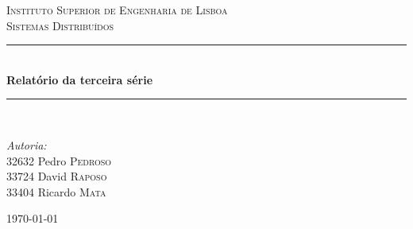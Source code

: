 \documentclass[a4paper]{article}
\newcommand{\HRule}{\rule{\linewidth}{0.5mm}} %
\begin{document}
\begin{titlepage}

\center %
 

\textsc{\LARGE Instituto Superior de Engenharia de Lisboa}\\[1.5cm] %
\textsc{\Large Sistemas Distribuídos}\\[0.5cm] %


\HRule \\[0.4cm]
{ \huge \bfseries Relatório da terceira série}\\[0.4cm] %
\HRule \\[1.5cm]
 

\begin{minipage}{0.4\textwidth}
\begin{flushleft} \large
\emph{Autoria:}\\
32632 Pedro \textsc{Pedroso} \\
33724 David \textsc{Raposo} \\
33404 Ricardo \textsc{Mata} \\
\end{flushleft}
\end{minipage}




\null
\vfill %
{\large \today}\\[3cm] %
\end{titlepage}

\end{document}
